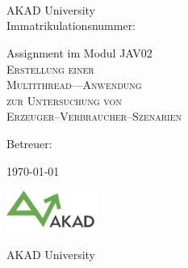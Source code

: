 

\begin{titlepage}


\vspace{5cm}

\Name \\ 
\Strasse \\ 
\PlzOrt\\ 
\href{mailto:\Email}{\Email}

AKAD University\\
Immatrikulationsnummer: \Immatrikulationsnummer

\vfill

Assignment im Modul JAV02\\
\LARGE
\textsc{Erstellung einer\\
Multithread—Anwendung\\
zur Untersuchung von\\
Erzeuger--Verbraucher--Szenarien
}

\vfill

\normalsize

Betreuer: \Betreuer

\today %

\vfill

\includegraphics[width=3cm]{akad_logo.png}  

AKAD University 

\end{titlepage}



\normalsize
